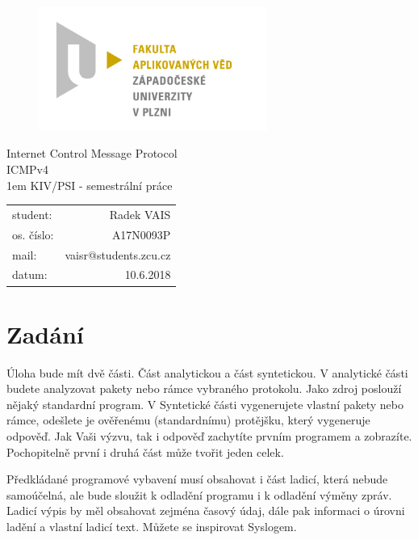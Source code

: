 \documentclass[12pt, a4paper]{article}
\begin{document}
\begin{figure}[h!]
\centering
\includegraphics[bb= 0 0 820 445 , width=75mm]{favlogo.jpg}
\end{figure}

{\centering
{\huge Internet Control Message Protocol}\\[1em]
{\large ICMPv4}\\1em
{\large KIV/PSI - semestrální práce}\\[11,5cm]
}

\begin{tabular}{l r}
student: & Radek VAIS\\
os. číslo: & A17N0093P\\
mail: & vaisr@students.zcu.cz\\
datum: & 10.6.2018\\
\end{tabular}

\thispagestyle{empty}
\newpage

\section{Zadání} %

Úloha bude mít dvě části. Část analytickou a část syntetickou. V analytické části budete analyzovat pakety nebo rámce vybraného protokolu. Jako zdroj poslouží nějaký standardní program. V Syntetické části vygenerujete vlastní pakety nebo rámce, odešlete je ověřenému (standardnímu) protějšku, který vygeneruje odpověď. Jak Vaši výzvu, tak i odpověď zachytíte prvním programem a zobrazíte. Pochopitelně první i druhá část může tvořit jeden celek.

Předkládané programové vybavení musí obsahovat i část ladicí, která nebude samoúčelná, ale bude sloužit k odladění programu i k odladění výměny zpráv. Ladicí výpis by měl obsahovat zejména časový údaj, dále pak informaci o úrovni ladění a vlastní ladicí text. Můžete se inspirovat Syslogem.
\end{document}
